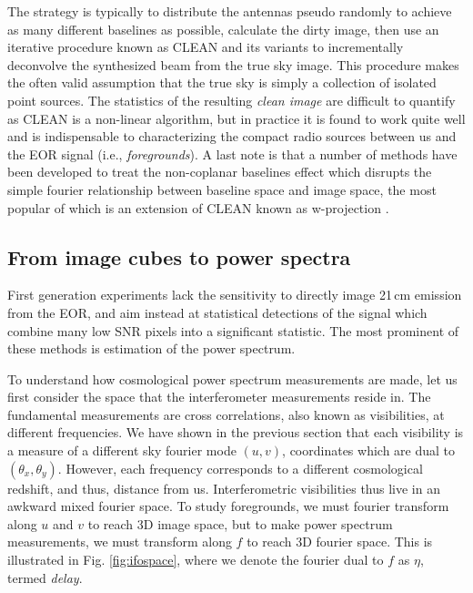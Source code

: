 {The strategy is typically to distribute the antennas pseudo randomly to achieve as many different baselines as possible, calculate the dirty image, then use an iterative procedure known as CLEAN \citep{hogbomclean} and its variants to incrementally deconvolve the synthesized beam from the true sky image. This procedure makes the often valid assumption that the true sky is simply a collection of isolated point sources. The statistics of the resulting \textit{clean image} are difficult to quantify as CLEAN is a non-linear algorithm, but in practice it is found to work quite well and is indispensable to characterizing the compact radio sources between us and the EOR signal (i.e., \textit{foregrounds}). A last note is that a number of methods have been developed to treat the non-coplanar baselines effect which disrupts the simple fourier relationship between baseline space and image space, the most popular of which is an extension of CLEAN known as w-projection \citep{wproj}.


\subsection{From image cubes to power spectra}

First generation experiments lack the sensitivity to directly image 21\,cm emission from the EOR, and aim instead at statistical detections of the signal which combine many low SNR pixels into a significant statistic. The most prominent of these methods is estimation of the power spectrum.

To understand how cosmological power spectrum measurements are made, let us first consider the space that the interferometer measurements reside in. The fundamental measurements are cross correlations, also known as visibilities, at different frequencies. We have shown in the previous section that each visibility is a measure of a different sky fourier mode $(u,v)$, coordinates which are dual to $(\theta_x,\theta_y)$. However, each frequency corresponds to a different cosmological redshift, and thus, distance from us. Interferometric visibilities thus live in an awkward mixed fourier space. To study foregrounds, we must fourier transform along $u$ and $v$ to reach 3D image space, but to make power spectrum measurements, we must transform along $f$ to reach 3D fourier space. This is illustrated in Fig. \ref{fig:ifospace}, where we denote the fourier dual to $f$ as $\eta$, termed \textit{delay}.

}
